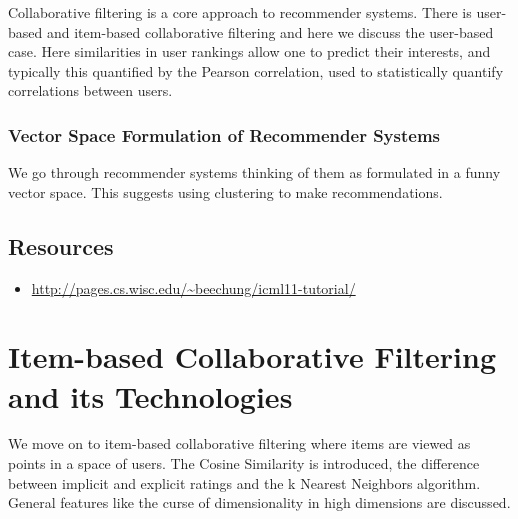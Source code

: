 Collaborative filtering is a core approach to recommender systems. There
is user-based and item-based collaborative filtering and here we discuss
the user-based case. Here similarities in user rankings allow one to
predict their interests, and typically this quantified by the Pearson
correlation, used to statistically quantify correlations between users.




\subsubsection{Vector Space Formulation of Recommender
Systems}

We go through recommender systems thinking of them as formulated in a
funny vector space. This suggests using clustering to make
recommendations.



\subsection{Resources}

\begin{itemize}

\item
  \url{http://pages.cs.wisc.edu/~beechung/icml11-tutorial/}
\end{itemize}

\section{Item-based Collaborative Filtering and its Technologies}

We move on to item-based collaborative filtering where items are viewed
as points in a space of users. The Cosine Similarity is introduced, the
difference between implicit and explicit ratings and the k Nearest
Neighbors algorithm. General features like the curse of dimensionality
in high dimensions are discussed.



